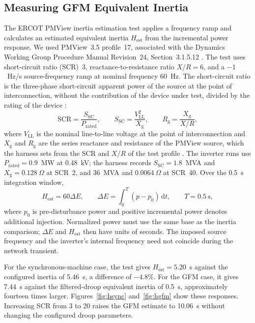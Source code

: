 \documentclass[11pt]{article}
\begin{document}
\subsection{Measuring GFM Equivalent Inertia}
\label{sec:inertiaest}
The ERCOT PMView inertia estimation test applies a frequency ramp and calculates an estimated equivalent inertia $H_{\mathrm{est}}$ from the incremental power response. We used PMView~3.5 profile~17, associated with the Dynamics Working Group Procedure Manual Revision~24, Section~3.1.5.12 \cite{pmview,dwg24}. The test uses short-circuit ratio (SCR)~3, reactance-to-resistance ratio $X/R=6$, and a $-1$~Hz/s source-frequency ramp at nominal frequency 60~Hz. The short-circuit ratio is the three-phase short-circuit apparent power of the source at the point of interconnection, without the contribution of the device under test, divided by the rating of the device \cite[Ch.~1]{nerc2017scr}:
\begin{equation}
\mathrm{SCR}=\frac{S_{\mathrm{SC}}}{P_{\mathrm{rated}}},\qquad
S_{\mathrm{SC}}=\frac{V_{\mathrm{LL}}^{2}}{X_{\mathrm{g}}},\qquad
R_{\mathrm{g}}=\frac{X_{\mathrm{g}}}{X/R},
\label{eq:scr}
\end{equation}
where $V_{\mathrm{LL}}$ is the nominal line-to-line voltage at the point of interconnection and $X_{\mathrm{g}}$ and $R_{\mathrm{g}}$ are the series reactance and resistance of the PMView source, which the harness sets from the SCR and $X/R$ of the test profile \cite{pmview}. The inverter runs use $P_{\mathrm{rated}}=0.9$~MW at 0.48~kV; the harness records $S_{\mathrm{SC}}=1.8$~MVA and $X_{\mathrm{g}}=0.128~\Omega$ at SCR~2, and 36~MVA and $0.0064~\Omega$ at SCR~40. Over the 0.5~s integration window,
\begin{equation}
H_{\mathrm{est}}=60\Delta E,\qquad
\Delta E=\int_0^T(p-p_0)\,\mathrm{d}t,\qquad T=0.5~\mathrm{s},
\label{eq:agsesr}
\end{equation}
where $p_0$ is pre-disturbance power and positive incremental power denotes additional injection. Normalized power must use the same base as the inertia comparison; $\Delta E$ and $H_{\mathrm{est}}$ then have units of seconds. The imposed source frequency and the inverter's internal frequency need not coincide during the network transient.

For the synchronous-machine case, the test gives $H_{\mathrm{est}}=5.20$~s against the configured inertia of 5.46~s, a difference of $-4.8\%$. For the GFM case, it gives 7.44~s against the filtered-droop equivalent inertia of 0.5~s, approximately fourteen times larger. Figures~\ref{fig:hsync} and~\ref{fig:hgfm} show these responses. Increasing SCR from 3 to 20 raises the GFM estimate to 10.06~s without changing the configured droop parameters.
\end{document}
